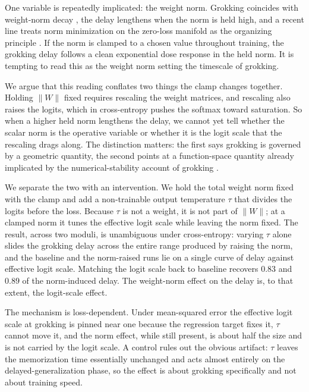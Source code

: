 One variable is repeatedly implicated: the weight norm. Grokking coincides with weight-norm decay
\citep{liu2023omnigrok}, the delay lengthens when the norm is held high, and a recent line treats norm
minimization on the zero-loss manifold as the organizing principle
\citep{musat2025geometry,boursier2025framework}. If the norm is clamped to a chosen value throughout
training, the grokking delay follows a clean exponential dose response in the held norm. It is tempting to
read this as the weight norm setting the timescale of grokking.

We argue that this reading conflates two things the clamp changes together. Holding $\|W\|$ fixed requires
rescaling the weight matrices, and rescaling also raises the logits, which in cross-entropy pushes the
softmax toward saturation. So when a higher held norm lengthens the delay, we cannot yet tell whether the
scalar norm is the operative variable or whether it is the logit scale that the rescaling drags along.
The distinction matters: the first says grokking is governed by a geometric quantity, the second points at
a function-space quantity already implicated by the numerical-stability account of grokking
\citep{prieto2025grokking}.

We separate the two with an intervention. We hold the total weight norm fixed with the clamp and add a
non-trainable output temperature $\tau$ that divides the logits before the loss. Because $\tau$ is not a
weight, it is not part of $\|W\|$; at a clamped norm it tunes the effective logit scale while leaving the
norm fixed. The result, across two moduli, is unambiguous under cross-entropy: varying $\tau$ alone slides
the grokking delay across the entire range produced by raising the norm, and the baseline and the
norm-raised runs lie on a single curve of delay against effective logit scale. Matching the logit scale
back to baseline recovers $0.83$ and $0.89$ of the norm-induced delay. The weight-norm effect on the delay
is, to that extent, the logit-scale effect.

The mechanism is loss-dependent. Under mean-squared error the effective logit scale at grokking is pinned
near one because the regression target fixes it, $\tau$ cannot move it, and the norm effect, while still
present, is about half the size and is not carried by the logit scale. A control rules out the obvious
artifact: $\tau$ leaves the memorization time essentially unchanged and acts almost entirely on the
delayed-generalization phase, so the effect is about grokking specifically and not about training speed.

